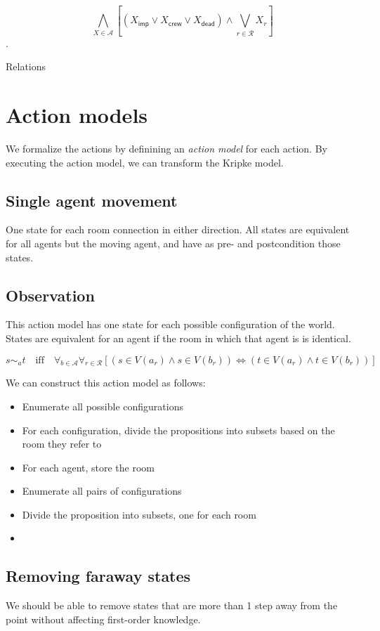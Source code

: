 \documentclass[a4paper]{scrartcl}
\begin{document}
$$\bigwedge_{X \in \mathcal{A}} \left[(X_\mathsf{imp}\lor X_\mathsf{crew} \lor X_\mathsf{dead}) \land \bigvee_{r \in \mathcal{R}} X_r\right]$$.

Relations

\section*{Action models}
We formalize the actions by definining an \emph{action model} for each action. By executing the action model, we can transform the Kripke model.

\subsection*{Single agent movement}
One state for each room connection in either direction. All states are equivalent for all agents but the moving agent, and have as pre- and postcondition those states. 

\subsection*{Observation}
This action model has one state for each possible configuration of the world. States are equivalent for an agent if the room in which that agent is is identical.

$$s \sim_a t \quad\mathrm{iff}\quad \forall_{b \in \mathcal{A}}\forall_{r \in \mathcal{R}} \left[ (s \in V(a_r)  \land s \in V(b_r)) \Leftrightarrow (t \in V(a_r)  \land t \in V(b_r))  \right] $$

We can construct this action model as follows:

\begin{itemize}
\item Enumerate all possible configurations
\item For each configuration, divide the propositions into subsets based on the room they refer to
\item For each agent, store the room
\item Enumerate all pairs of configurations
\item Divide the proposition into subsets, one for each room
\item 
\end{itemize}


\subsection*{Removing faraway states}
We should be able to remove states that are more than 1 step away from the point without affecting first-order knowledge.
\end{document}
